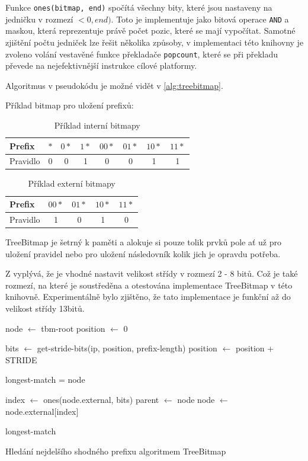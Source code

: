 Funkce \texttt{ones(bitmap, end)} spočítá všechny bity, které jsou nastaveny na jedničku v rozmezí $<0, end)$.
Toto je implementuje jako bitová operace \texttt{AND} a maskou, která reprezentuje právě počet pozic, které se
mají vypočítat. Samotné zjištění počtu jedniček lze řešit několika způsoby, v implementaci této knihovny
je zvoleno volání vestavěné funkce překladače \texttt{popcount}, které se při překladu převede na nejefektivnější
instrukce cílové platformy.

Algoritmus v pseudokódu je možné vidět v \ref{alg:treebitmap}.

Příklad bitmap pro uložení prefixů:

\begin{table}
	\center
	\label{tab:tbm-internal}
    \begin{tabular}{|l||c|c|c|c|c|c|c|}
    \hline
    Prefix & $*$ & $0*$ & $1*$ & $00*$ & $01*$ & $10*$ & $11*$ \\ \hline
    Pravidlo & 0 & 0  & 1  & 0   & 0   & 1   & 1   \\ \hline
    \end{tabular}
    \caption{Příklad interní bitmapy}
\end{table}

\begin{table}
	\center
	\label{tab:tbm-external}
    \begin{tabular}{|l||c|c|c|c|}
    \hline
    Prefix & $00*$ & $01*$ & $10*$ & $11*$ \\ \hline
    Pravidlo & 1 & 0 & 1 & 0 \\ \hline
    \end{tabular}
    \caption{Příklad externí bitmapy}
\end{table}

TreeBitmap je šetrný k paměti a alokuje si pouze tolik prvků pole ať už pro uložení pravidel
nebo pro uložení následovník kolik jich je opravdu potřeba.

Z \cite{tbm} vyplývá, že je vhodné nastavit velikost střídy v rozmezí 2 - 8 bitů. Což je také rozmezí,
na které je soustředěna a otestována implementace TreeBitmap v této knihovně. Experimentálně bylo zjištěno,
že tato implementace je funkční až do velikost střídy 13bitů.

\begin{algorithm}[H]
	\label{alg:treebitmap}
	node $\leftarrow$ tbm-root\;
	position $\leftarrow$ 0\;
	{
		bits $\leftarrow$ get-stride-bits(ip, position, prefix-length)\;
		position $\leftarrow$ position + STRIDE\;

		{
			longest-match = node\;
		}

		index $\leftarrow$ ones(node.external, bits)\;
		parent $\leftarrow$ node\;
		node $\leftarrow$ node.external[index]\;
	}
	\Return longest-match\;
	\caption{Hledání nejdelšího shodného prefixu algoritmem TreeBitmap}
\end{algorithm}

